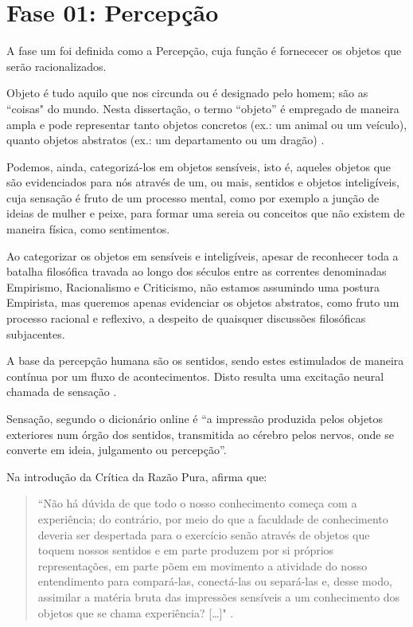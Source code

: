 \section{\hspace*{3pt} Fase 01: Percepção}
\label{sec:percepcao}

A fase um foi definida como a Percepção, cuja função é fornececer os objetos que serão racionalizados. 

Objeto é tudo aquilo que nos circunda ou é designado pelo homem; são as ``coisas" do mundo. Nesta dissertação, o termo ``objeto” é empregado de maneira ampla e pode representar tanto objetos concretos (ex.: um animal ou um veículo), quanto objetos abstratos (ex.: um departamento ou um dragão) \cite{dahlberg:1978.teoria, machado:2009.projeto}. 

Podemos, ainda, categorizá-los em objetos sensíveis, isto é, aqueles objetos que são evidenciados para nós através de um, ou mais, sentidos e objetos inteligíveis, cuja sensação é fruto de um processo mental, como por exemplo a junção de ideias de mulher e peixe, para formar uma sereia ou conceitos que não existem de maneira física, como sentimentos. 

Ao categorizar os objetos em sensíveis e inteligíveis, apesar de reconhecer toda a batalha filosófica travada ao longo dos séculos entre as correntes denominadas Empirismo, Racionalismo e Criticismo, não estamos assumindo uma postura Empirista, mas queremos apenas evidenciar os objetos abstratos, como fruto um processo racional e reflexivo, a despeito de quaisquer discussões filosóficas subjacentes. 

A base da percepção humana são os sentidos, sendo estes estimulados de maneira contínua por um fluxo de acontecimentos. Disto resulta uma excitação neural chamada de sensação \cite{alexandre:2007.factores}.

Sensação, segundo o dicionário online  é ``a impressão produzida pelos objetos exteriores num órgão dos sentidos, transmitida ao cérebro pelos nervos, onde se converte em ideia, julgamento ou percepção''.

Na introdução da Crítica da Razão Pura,  afirma que: 

\begin{quote}
``Não há dúvida de que todo o nosso conhecimento começa com a experiência; do contrário, por meio do que a faculdade de conhecimento deveria ser despertada para o exercício senão através de objetos que toquem nossos sentidos e em parte produzem por si próprios representações, em parte põem em movimento a atividade do nosso entendimento para compará-las, conectá-las ou separá-las e, desse modo, assimilar a matéria bruta das impressões sensíveis a um conhecimento dos objetos que se chama experiência? […]" \cite[p.23]{kant:1983.critica}.
\end{quote}
 
